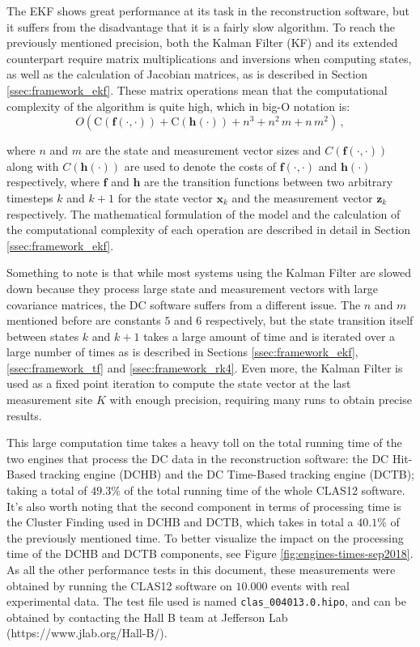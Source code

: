 The EKF shows great performance at its task in the reconstruction software, but it suffers from the disadvantage that it is a fairly slow algorithm.
To reach the previously mentioned precision, both the Kalman Filter (KF) and its extended counterpart require matrix multiplications and inversions when computing states, as well as the calculation of Jacobian matrices, as is described in Section \ref{ssec:framework_ekf}.
These matrix operations mean that the computational complexity of the algorithm is quite high, which in big-O notation is:
    \begin{equation*}
        O(\text{C}(\mathbf{f}(\cdot, \cdot)) + \text{C}(\mathbf{h}(\cdot)) + n^3 + n^2\,m + n\,m^2)\,,
    \end{equation*}


where $n$ and $m$ are the state and measurement vector sizes and $C(\mathbf{f}(\cdot, \cdot))$ along with $C(\mathbf{h}(\cdot))$ are used to denote the costs of $\mathbf{f}(\cdot, \cdot)$ and $\mathbf{h}(\cdot)$ respectively, where $\mathbf{f}$ and $\mathbf{h}$ are the transition functions between two arbitrary timesteps $k$ and $k+1$ for the state vector $\mathbf{x}_k$ and the measurement vector $\mathbf{z}_k$ respectively.
The mathematical formulation of the model and the calculation of the computational complexity of each operation are described in detail in Section \ref{ssec:framework_ekf}.

Something to note is that while most systems using the Kalman Filter are slowed down because they process large state and measurement vectors with large covariance matrices, the DC software suffers from a different issue.
The $n$ and $m$ mentioned before are constants $5$ and $6$ respectively, but the state transition itself between states $k$ and $k+1$ takes a large amount of time and is iterated over a large number of times as is described in Sections \ref{ssec:framework_ekf}, \ref{ssec:framework_tf} and \ref{ssec:framework_rk4}.
Even more, the Kalman Filter is used as a fixed point iteration to compute the state vector at the last measurement site $K$ with enough precision, requiring many runs to obtain precise results.

This large computation time takes a heavy toll on the total running time of the two engines that process the DC data in the reconstruction software: the DC Hit-Based tracking engine (DCHB) and the DC Time-Based tracking engine (DCTB); taking a total of $49.3\%$ of the total running time of the whole CLAS12 software.
It's also worth noting that the second component in terms of processing time is the Cluster Finding used in DCHB and DCTB, which takes in total a $40.1\%$ of the previously mentioned time.
To better visualize the impact on the processing time of the DCHB and DCTB components, see Figure \ref{fig:engines-times-sep2018}.
As all the other performance tests in this document, these measurements were obtained by running the CLAS12 software on $10.000$ events with real experimental data.
The test file used is named \texttt{clas\_004013.0.hipo}, and can be obtained by contacting the Hall B team at Jefferson Lab (https://www.jlab.org/Hall-B/).

